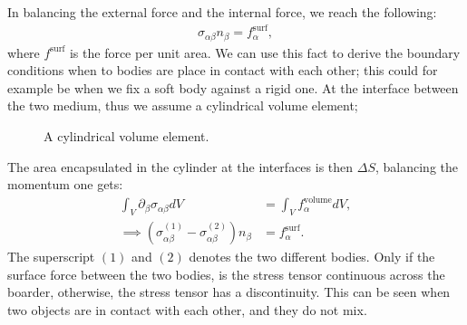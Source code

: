 \documentclass[a4paper]{article}
\begin{document}
\vspace*{0.5cm}\noindent
In balancing the external force and the internal force, we reach the following:
\begin{align*}
    \sigma_{\alpha\beta}n_\beta = f_\alpha^{\text{surf}},
\end{align*}where $f^{\text{surf}}$ is the force per unit area. We can use this fact to derive the boundary conditions when to bodies are place in contact with each other; this could for example be when we fix a soft body against a rigid one.
At the interface between the two medium, thus we assume a cylindrical volume element;
\begin{figure}[H]
    \centering
    \caption{A cylindrical volume element.}
    \label{fig: cylindrical volume element}
\end{figure}\noindent
The area encapsulated in the cylinder at the interfaces is then $\Delta S$, balancing the momentum one gets:
\begin{align*}
    \int_V \partial_\beta\sigma_{\alpha\beta}dV &= \int_V f_\alpha^\text{volume}dV,\\
    \implies \left(\sigma_{\alpha\beta}^{(1)} - \sigma_{\alpha\beta}^{(2)}\right)n_\beta &= f_\alpha^\text{surf}.
\end{align*}The superscript $(1)$ and $(2)$ denotes the two different bodies. Only if the surface force between the two bodies, is the stress tensor continuous across the boarder, otherwise, the stress tensor has a discontinuity. This can be seen when two objects are in contact with each other, and they do not mix.
\end{document}
